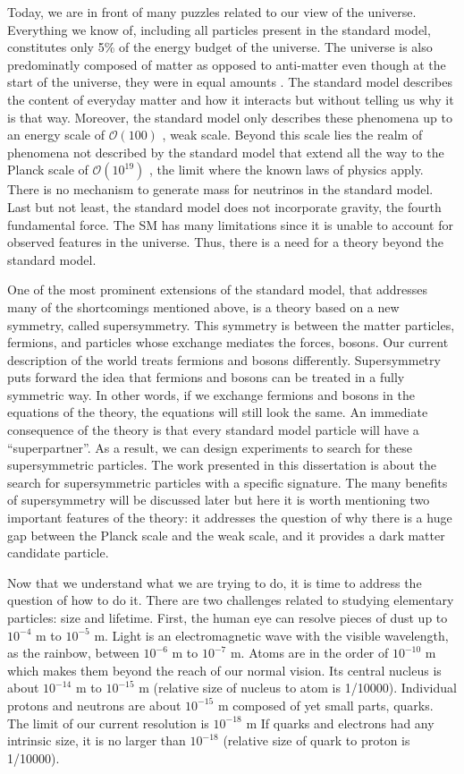 Today, we are in front of many puzzles related to our view of the universe.
Everything we know of, including all particles present in the standard model, 
constitutes only 5\% of the energy budget of the universe. 
The universe is also predominatly composed of matter as opposed to 
anti-matter even though at the start of the universe, they were in equal 
amounts%
. The standard model describes the content of 
everyday matter 
and how it interacts but without telling us why it is that way.
Moreover, the standard model only describes these phenomena 
up to an energy scale of $\mathcal{O}\left(100\right)$ \GeV, weak scale.
Beyond this scale lies the realm of phenomena not described by the standard 
model that extend all the way to the Planck scale of 
$\mathcal{O}\left(10^{19}\right)$ \GeV, the limit where the known laws of 
physics apply. 
There is no mechanism to generate mass for 
neutrinos in the standard model. Last but not least, the standard model 
does not incorporate gravity, the fourth fundamental force.
The SM has many limitations since it is unable to account for observed 
features in the universe. 
Thus, there is a need for a theory beyond the standard model.

One of the most prominent extensions of the standard model, 
that addresses many of the shortcomings mentioned above, is a theory based on 
a new symmetry, called supersymmetry.
This symmetry is between the matter particles, fermions, and particles whose
exchange mediates the forces, bosons. Our current description of the world
treats fermions and bosons differently. Supersymmetry puts forward the idea
that fermions and bosons can be treated in a fully symmetric way. 
In other words,
if we exchange fermions and bosons in the equations of the theory, the 
equations will still look the same. An immediate consequence of the theory
is that every standard model particle will have a ``superpartner''.
As a result, we can design experiments to search for these 
supersymmetric particles. The work presented in this dissertation is about the search for supersymmetric particles with a specific signature.
The many benefits of supersymmetry will be discussed later but here it is worth 
mentioning two important features of the theory: it addresses the question 
of why there is a huge gap between the Planck scale and the weak scale, 
and it provides a dark matter candidate particle. 

Now that we understand what we are trying to do, it is time to address 
the question of how to do it.
There are two challenges related to studying elementary particles: 
size and lifetime.
First, the human eye can resolve pieces of dust up to $10^{-4}$ m to 
$10^{-5}$ m. 
Light is an electromagnetic wave with the visible wavelength, as the 
rainbow, between $10^{-6}$ m to $10^{-7}$ m. 
Atoms are in the order of $10^{-10}$ m which makes them beyond the reach of 
our normal vision.
Its central nucleus is about $10^{-14}$ m to $10^{-15}$ m
(relative size of nucleus to atom is 1/10000).
Individual protons and neutrons are about $10^{-15}$ m
composed of yet small parts, quarks.
The limit of our current resolution is $10^{-18}$ m
If quarks and electrons had any intrinsic size, it is no 
larger than $10^{-18}$
(relative size of quark to proton is 1/10000).

